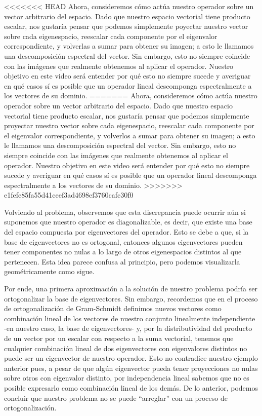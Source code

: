 \documentclass[12pt,dvipsnames]{article}
\numberwithin{equation}{section}
\begin{document}
<<<<<<< HEAD
Ahora, consideremos cómo actúa nuestro operador sobre un vector arbitrario del espacio. Dado que nuestro espacio vectorial tiene producto escalar, nos gustaría pensar que podemos simplemente poyectar nuestro vector sobre cada eigenespacio, reescalar cada componente por el eigenvalor correspondiente, y volverlas a sumar para obtener su imagen; a esto le llamamos una descomposición espectral del vector. Sin embargo, esto no siempre coincide con las imágenes que realmente obtenemos al aplicar el operador. Nuestro objetivo en este video será entender por qué esto no siempre sucede y averiguar en qué casos sí es posible que un operador lineal descomponga espectralmente a los vectores de su dominio.
=======
Ahora, consideremos cómo actúa nuestro operador sobre un vector arbitrario del espacio. Dado que nuestro espacio vectorial tiene producto escalar, nos gustaría pensar que podemos simplemente proyectar nuestro vector sobre cada eigenespacio, reescalar cada componente por el eigenvalor correspondiente, y volverlos a sumar para obtener su imagen; a esto le llamamos una descomposición espectral del vector. Sin embargo, esto no siempre coincide con las imágenes que realmente obtenemos al aplicar el operador. Nuestro objetivo en este video será entender por qué esto no siempre sucede y averiguar en qué casos sí es posible que un operador lineal descomponga espectralmente a los vectores de su dominio.
>>>>>>> e1fefe85fa55d41ceef3ad4698ef3760cafc30f0

Volviendo al problema, observemos que esta discrepancia puede ocurrir aún si suponemos que nuestro operador es diagonalizable, es decir, que existe una base del espacio compuesta por eigenvectores del operador. Esto se debe a que, si la base de eigenvectores no es ortogonal, entonces algunos eigenvectores pueden tener componentes no nulas a lo largo de otros eigenespacios distintos al que pertenecen. Esta idea parece confusa al principio, pero podemos visualizarla geométricamente como sigue.

Por ende, una primera aproximación a la solución de nuestro problema podría ser ortogonalizar la base de eigenvectores. Sin embargo, recordemos que en el proceso de ortogonalización de Gram-Schmidt definimos nuevos vectores como combinación lineal de los vectores de nuestro conjunto linealmente independiente -en nuestro caso, la base de eigenvectores- y, por la distributividad del producto de un vector por un escalar con respecto a la suma vectorial, tenemos que cualquier combinación lineal de dos eigenvectores con eigenvalores distintos no puede ser un eigenvector de nuestro operador. Esto no contradice nuestro ejemplo anterior pues, a pesar de que algún eigenvector pueda tener proyecciones no nulas sobre otros con eigenvalor distinto, por independencia lineal sabemos que no es posible expresarlo como combinación lineal de los demás. De lo anterior, podemos concluir que nuestro problema no se puede ``arreglar'' con un proceso de ortogonalización.
\end{document}
